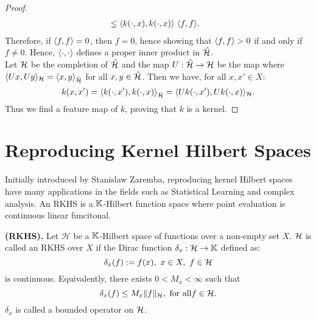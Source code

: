 \documentclass[twoside]{memoir}
\begin{document}
\begin{proof}
\begin{equation*}
\begin{split}
		&\leq \langle k(\cdot, x), k(\cdot, x)\rangle ~ \langle f, f\rangle. 
		\end{split}
		\end{equation*}
		Therefore, if $\langle f, f\rangle = 0$, then $f = 0$, hence showing that $\langle f, f\rangle > 0$ if and only if $f \neq 0$. Hence, $\langle\cdot, \cdot\rangle$ defines a proper inner product in $\hat{\mathcal{H}}$. \\
		Let $\mathcal{H}$ be the completion of $\hat{\mathcal{H}}$ and the map $U: \hat{\mathcal{H}} \rightarrow \mathcal{H}$ be the map where $\langle Ux, Uy\rangle_{\mathcal{H}} = \langle x, y\rangle_{\hat{\mathcal{H}}} $ for all $x, y \in \hat{\mathcal{H}}$. Then we have, for all $x, x' \in X$:
		\[ k(x, x') = \langle k(\cdot, x'), k(\cdot, x)\rangle _{\hat{\mathcal{H}}} = \langle Uk(\cdot, x'), Uk(\cdot, x)\rangle_{\mathcal{H}}. \] Thus we find a feature map of $k$, proving that $k$ is a kernel.
	\end{proof}
	
	\section{Reproducing Kernel Hilbert Spaces} \label{sec:RKHS}
	Initially introduced by Stanislaw Zaremba, reproducing kernel Hilbert spaces have many applications in the fields such as Statistical Learning and complex analysis. An RKHS is a $\mathbb{K}$-Hilbert function space where point evaluation is continuous linear funcitonal.
	\begin{defn}
		\textbf{(RKHS).} Let $\mathcal{H}$ be a $\mathbb{K}$-Hilbert space of functions over a non-empty set $X$. $\mathcal{H}$ is called an RKHS over $X$ if the Dirac function $\delta_x: \mathcal{H} \rightarrow \mathbb{K}$ defined as:
		\[ \delta_x(f) := f(x), ~ x \in X, ~ f \in \mathcal{H} \] is continuous.
		Equivalently, there exists $ 0 < M_x < \infty $ such that
		\[ \delta_x(f) \leq M_x \lVert f\rVert_\mathcal{H}, ~ \text{for all} f \in \mathcal{H}. \]
		$\delta_x$ is called a bounded operator on $\mathcal{H}$.
	\end{defn}
	
\end{document}
